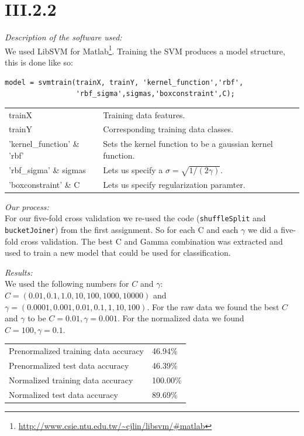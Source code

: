 \section*{III.2.2}

\textit{Description of the software used:}\\
We used LibSVM for
Matlab\footnote{\url{http://www.csie.ntu.edu.tw/\~cjlin/libsvm/\#matlab}}.
Training the SVM produces a model structure, this is done like so:
\begin{verbatim}
model = svmtrain(trainX, trainY, 'kernel_function','rbf',
                 'rbf_sigma',sigmas,'boxconstraint',C);
\end{verbatim}


\begin{tabular}{|l l|}
\hline
trainX                      & Training data features.\\
trainY                      & Corresponding training data classes.\\
'kernel\_function' \& 'rbf' & Sets the kernel function to be a gaussian kernel function.\\
'rbf\_sigma' \& sigmas      & Lets us specify a $\sigma = \sqrt{1/(2\gamma)}$.\\
'boxconstraint' \& C        & Lets us specify regularization paramter.\\\hline
\end{tabular}

\noindent \textit{Our process:}\\
For our five-fold cross validation we re-used the code (\texttt{shuffleSplit}
and \texttt{bucketJoiner}) from the first assignment. So for each C and each
$\gamma$ we did a five-fold cross validation. The best C and Gamma combination
was extracted and used to train a new model that could be used for
classification.

\noindent \textit{Results:}\\
We used the following numbers for $C$ and $\gamma$: $C = (0.01, 0.1, 1.0, 10,
100, 1000, 10000)$ and $\gamma = (0.0001, 0.001, 0.01, 0.1, 1, 10, 100)$. For
the raw data we found the best $C$ and $\gamma$ to be $C=0.01,
\gamma=0.001$. For the normalized data we found $C=100, \gamma=0.1$.

\begin{tabular}{l l}
Prenormalized training data accuracy &  46.94\%\\
Prenormalized test data accuracy     &  46.39\%\\
Normalized training data accuracy    & 100.00\%\\
Normalized test data accuracy        &  89.69\%\\
\end{tabular}

